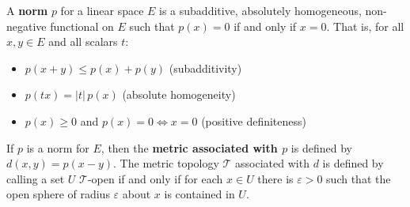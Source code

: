 A \textbf{norm} $p$ for a linear space $E$ is a subadditive, absolutely homogeneous, non-negative functional on $E$ such that $p(x) = 0$ if and only if $x = 0$. That is, for all $x, y \in E$ and all scalars $t$:

\begin{itemize}
\item $p(x + y) \leq p(x) + p(y)$ (subadditivity)
\item $p(tx) = |t|\,p(x)$ (absolute homogeneity)
\item $p(x) \geq 0$ and $p(x) = 0 \iff x = 0$ (positive definiteness)
\end{itemize}

If $p$ is a norm for $E$, then the \textbf{metric associated with $p$} is defined by $d(x, y) = p(x - y)$. The metric topology $\mathcal{T}$ associated with $d$ is defined by calling a set $U$ $\mathcal{T}$-open if and only if for each $x \in U$ there is $\varepsilon > 0$ such that the open sphere of radius $\varepsilon$ about $x$ is contained in $U$.
